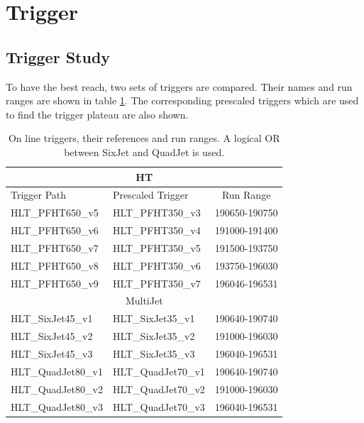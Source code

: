 \section{Trigger}
\label{sect:trigger}
\subsection{Trigger Study}
\label{sect:triggerstudy}

To have the best reach, two sets of triggers are compared. Their names and run ranges are shown in 
table \ref{Tab.TriggerPaths}. The corresponding prescaled triggers which are used to find the trigger plateau are also shown.

\begin{table}[!htb]
\begin{center}
\caption{On line triggers, their references and run ranges. A logical OR between SixJet and QuadJet is used.}
\label{Tab.TriggerPaths}
\begin{tabular}{|l|l|c|}
\hline
\multicolumn{3}{|c|}{HT}\\
\hline
Trigger Path & Prescaled Trigger & Run Range \\\hline
HLT\_PFHT650\_v5 & HLT\_PFHT350\_v3 & 190650-190750\\
HLT\_PFHT650\_v6 & HLT\_PFHT350\_v4 & 191000-191400\\ 
HLT\_PFHT650\_v7 & HLT\_PFHT350\_v5 & 191500-193750\\ 
HLT\_PFHT650\_v8 & HLT\_PFHT350\_v6 & 193750-196030\\ 
HLT\_PFHT650\_v9 & HLT\_PFHT350\_v7 & 196046-196531\\ 
\hline
\multicolumn{3}{|c|}{MultiJet}\\
\hline
HLT\_SixJet45\_v1  & HLT\_SixJet35\_v1  & 190640-190740\\
HLT\_SixJet45\_v2  & HLT\_SixJet35\_v2  & 191000-196030\\
HLT\_SixJet45\_v3  & HLT\_SixJet35\_v3  & 196040-196531\\
HLT\_QuadJet80\_v1 & HLT\_QuadJet70\_v1 & 190640-190740\\
HLT\_QuadJet80\_v2 & HLT\_QuadJet70\_v2 & 191000-196030\\
HLT\_QuadJet80\_v3 & HLT\_QuadJet70\_v3 & 196040-196531\\
\hline
\end{tabular}
\end{center}
\end{table}

